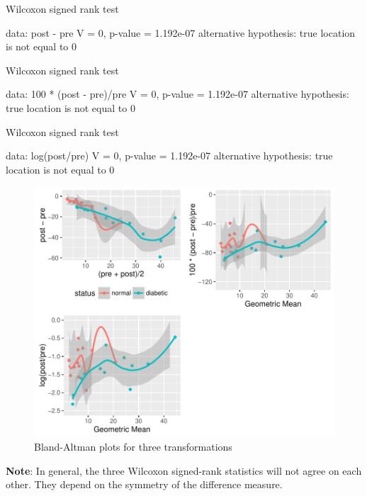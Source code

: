 \begin{Schunk}
\begin{Soutput}
	Wilcoxon signed rank test

data:  post - pre
V = 0, p-value = 1.192e-07
alternative hypothesis: true location is not equal to 0


	Wilcoxon signed rank test

data:  100 * (post - pre)/pre
V = 0, p-value = 1.192e-07
alternative hypothesis: true location is not equal to 0


	Wilcoxon signed rank test

data:  log(post/pre)
V = 0, p-value = 1.192e-07
alternative hypothesis: true location is not equal to 0
\end{Soutput}
\begin{figure}[htbp]

\centerline{\includegraphics{change-analysis-1} }

\caption[Bland-Altman plots for three transformations]{Bland-Altman plots for three transformations}\label{fig:change-analysis}
\end{figure}
\end{Schunk}
\textbf{Note}: In general, the three Wilcoxon signed-rank statistics
will not agree on each other.  They depend on the symmetry of the
difference measure.
\nocite{kai89,tor85how,mar85mod,kro93spu,col00sym}

